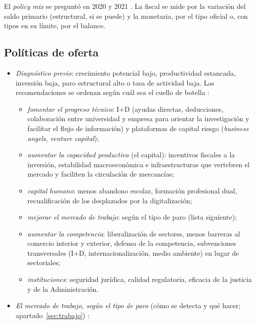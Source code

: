 \documentclass[11pt]{article}
\begin{document}
\begin{notaopositor}
El \emph{policy mix} se preguntó en 2020 y 2021 \parencite{ATCEE2026Examenes}. La fiscal se mide por la variación del saldo primario (estructural, si se puede) y la monetaria, por el tipo oficial o, con tipos en su límite, por el balance.
\end{notaopositor}

\subsection{Políticas de oferta}\label{sec:politicas-oferta}

\begin{itemize}
\item \emph{Diagnóstico previo}: crecimiento potencial bajo, productividad estancada, inversión baja, paro estructural alto o tasa de actividad baja. Las recomendaciones se ordenan según cuál sea el cuello de botella  :
  \begin{itemize}
  \item \emph{fomentar el progreso técnico}: I+D (ayudas directas, deducciones, colaboración entre universidad y empresa para orientar la investigación y facilitar el flujo de información) y plataformas de capital riesgo (\emph{business angels}, \emph{venture capital});
  \item \emph{aumentar la capacidad productiva} (el capital): incentivos fiscales a la inversión, estabilidad macroeconómica e infraestructuras que vertebren el mercado y faciliten la circulación de mercancías;
  \item \emph{capital humano}: menos abandono escolar, formación profesional dual, recualificación de los desplazados por la digitalización;
  \item \emph{mejorar el mercado de trabajo}: según el tipo de paro (lista siguiente);
  \item \emph{aumentar la competencia}: liberalización de sectores, menos barreras al comercio interior y exterior, defensa de la competencia, subvenciones transversales (I+D, internacionalización, medio ambiente) en lugar de sectoriales;
  \item \emph{instituciones}: seguridad jurídica, calidad regulatoria, eficacia de la justicia y de la Administración.
  \end{itemize}
\item \emph{El mercado de trabajo, según el tipo de paro} (cómo se detecta y qué hacer; apartado~\ref{sec:trabajo})  :

\end{itemize}
\end{document}
